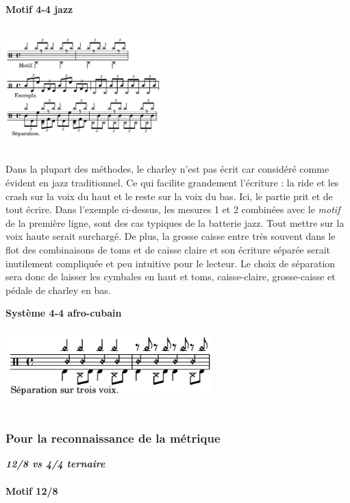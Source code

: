 \textbf{Motif 4-4 jazz}\\\\
\includegraphics[height=45mm, width=60mm]{z_images/1_description_notation/separation/2_separation_4-4_jazz.png}\\\\
Dans la plupart des méthodes, le charley n’est pas écrit car considéré comme évident en jazz traditionnel. Ce qui facilite grandement l’écriture : la ride et les crash sur la voix du haut et le reste sur la voix du bas. Ici, le partie prit et de tout écrire. Dans l’exemple ci-dessus, les mesures 1 et 2 combinées avec le \textit{motif} de la première ligne, sont des cas typiques de la batterie jazz. Tout mettre sur la voix haute serait surchargé. De plus, la grosse caisse entre très souvent dans le flot des combinaisons de toms et de caisse claire et son écriture séparée serait inutilement compliquée et peu intuitive pour le lecteur. Le choix de séparation sera donc de laisser les cymbales en haut et toms, caisse-claire, grosse-caisse et pédale de charley en bas.
\newpage

\textbf{Système 4-4 afro-cubain}\\\\
\includegraphics[height=25mm, width=80mm]{z_images/1_description_notation/separation/3_separation_afro-cubain.png}\\\\

\subsubsection{Pour la reconnaissance de la métrique}
\textit{\textbf{12/8 vs 4/4 ternaire}}\\\\
\textbf{Motif 12/8}\\\\

